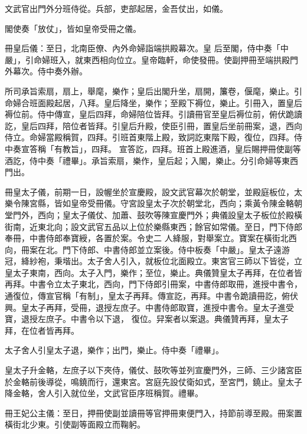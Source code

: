 \begin{pinyinscope}
 文武官出門外分班侍從。兵部，吏部起居，金吾仗出，如儀。



 閣使奏「放仗」，皆如皇帝受冊之儀。



 冊皇后儀：至日，北南臣僚、內外命婦詣端拱殿幕次。皇
 后至閣，侍中奏「中嚴」，引命婦班入，就東西相向位立。皇帝臨軒，命使發冊。使副押冊至端拱殿門外幕次。侍中奏外辦。



 所司承旨索扇，扇上，舉麾，樂作；皇后出閣升坐，扇開，簾卷，偃麾，樂止。引命婦合班面殿起居，八拜。皇后降坐，樂作；至殿下褥位，樂止。引冊入，置皇后褥位前。侍中傳宣，皇后四拜，命婦陪位皆拜。引讀冊官至皇后褥位前，俯伏跪讀訖，皇后四拜，陪位者皆拜。引皇后升殿，使臣引冊，置皇后坐前冊案，退，西向侍立。命婦當殿稱賀，四拜。引班首東階上殿，致詞訖東階下殿，復位，四拜。侍中奏宣答稱「有教旨」，四拜。
 宣答訖，四拜。班首上殿進酒，皇后賜押冊使副等酒訖，侍中奏「禮畢」。承旨索扇，樂作，皇后起；入閣，樂止。分引命婦等東西門出。



 冊皇太子儀，前期一日，設幄坐於宣慶殿，設文武官幕次於朝堂，並殿庭板位，太樂令陳宮縣，皆如皇帝受冊儀。守宮設皇太子次於朝堂北，西向；乘黃令陳金輅朝堂門外，西向；皇太子儀仗、加蕭、鼓吹等陳宣慶門外；典儀設皇太子板位於殿橫街南，近東北向；設文武官五品以上位於樂縣東西；餘官如常儀。至日，門下侍郎奉冊，中書侍郎奉寶綬，各置於案。令史二
 人絳服，對舉案立。寶案在橫街北西向，冊案在北。門下侍郎、中書侍郎並立案後。侍中板奏「中嚴」。皇太子遠游冠，絳紗袍，秉堦出。太子舍人引入，就板位北面殿立。東宮官三師以下皆從，立皇太子東南，西向。太子入門，樂作；至位，樂止。典儀贊皇太子再拜，在位者皆再拜。中書令立太子東北，西向，門下侍郎引冊案，中書侍郎取冊，進授中書令，通復位，傳宣官稱「有制」，皇太子再拜。傳宣訖，再拜。中書令跪讀冊訖，俯伏興。皇太子再拜，受冊，退授左庶子。中書侍郎取寶，進授中書令。皇太子進受寶，退授左庶子。中書令以下退，
 復位。舁案者以案退。典儀贊再拜，皇太子拜，在位者皆再拜。



 太子舍人引皇太子退，樂作；出門，樂止。侍中奏「禮畢」。



 皇太子升金輅，左庶子以下夾侍，儀仗、鼓吹等並列宣慶門外，三師、三少諸宮臣於金輅前後導從，鳴鐃而行，還東宮。宮庭先設仗衛如式，至宮門，鐃止。皇太子降金輅，舍人引入就位坐，文武官臣序班稱賀。禮畢。



 冊王妃公主儀：至日，押冊使副並讀冊等官押冊東便門入，持節前導至殿。冊案置橫街北少東。引使副等面殿立而鞠躬。




\end{pinyinscope}
